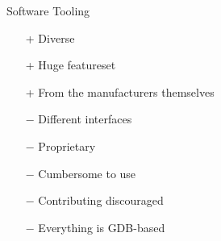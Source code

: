 \documentclass[aspectratio=1610,14pt,t]{beamer}
\begin{document}
\begin{frame}[c]{Software Tooling}
  \begin{itemize}
    \item[+] Diverse
    \item[+] Huge featureset
    \item[+] From the manufacturers themselves
    \item[−] Different interfaces
    \item[−] Proprietary
    \item[−] Cumbersome to use
    \item[−] Contributing discouraged
    \item[−] Everything is GDB-based
  \end{itemize}
\end{frame}
\end{document}
